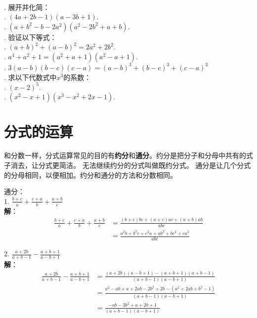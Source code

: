 \documentclass[12pt,UTF8,fontset=none]{ctexbook}
\begin{document}
\begin{xt}\label{xt:5-0-0}
    \mbox{}\\
    . 展开并化简：\\
    . $(4a + 2b - 1)(a - 3b + 1).$\\  %
    . $(a + b^2 - b - 2a^2)(a^2 - 2b^2 + a + b).$\\  %
    . 验证以下等式：\\
    . $(a + b)^2 + (a - b)^2 = 2a^2+2b^2.$\\
    . $a^4 + a^2 + 1 = (a^2+a+1)(a^2-a+1).$\\
    . $3(a-b)(b-c)(c-a) = (a-b)^3+(b-c)^3+(c-a)^3$\\
    . 求以下代数式中$x^3$的系数：\\
    . $(x - 2)^5.$\\
    . $(x^2 - x + 1)(x^3 - x^2 +2x - 1).$
\end{xt}

\section{分式的运算}

和分数一样，分式运算常见的目的有\textbf{约分}和\textbf{通分}。约分是把分子和分母中共有的式子消去，让分式更简洁。
无法继续约分的分式叫做既约分式。
通分是让几个分式的分母相同，以便相加。约分和通分的方法和分数相同。

\begin{ex}\label{ex:5-1-0}
    通分：\\
    1. $\frac{b+c}{a} + \frac{c+a}{b} + \frac{a+b}{c}$\\
    \textbf{解}：
    \begin{align*}
        \frac{b+c}{a} + \frac{c+a}{b} + \frac{a+b}{c} &= \frac{(b+c)bc+(a+c)ac+(a+b)ab}{abc} \\
        &= \frac{ a^2b+b^2c+c^2a + ab^2+bc^2+ca^2}{abc} 
    \end{align*}

    2. $\frac{a+2b}{a+b-1} - \frac{a+b+1}{a-b+1}$\\
    \textbf{解}：
    \begin{align*}
        \frac{a+2b}{a+b-1} - \frac{a+b+1}{a-b+1} &= \frac{(a+2b)(a-b+1) - (a+b+1)(a+b-1)}{(a+b-1)(a-b+1)} \\
        &=  \frac{a^2-ab+a+2ab-2b^2+2b - (a^2+2ab+b^2-1)}{(a+b-1)(a-b+1)}  \\
        &= \frac{-ab-3b^2+a+2b+1}{(a+b-1)(a-b+1)} 
    \end{align*}
\end{ex}
\end{document}
